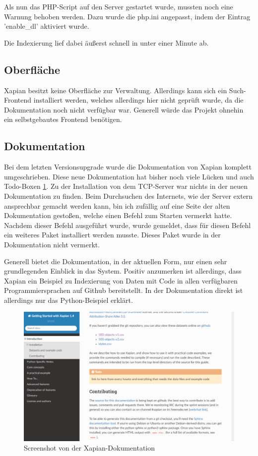 Als nun das PHP-Script auf den Server gestartet wurde, mussten noch eine Warnung behoben werden. Dazu wurde die php.ini angepasst, indem der Eintrag 'enable\_dl' aktiviert wurde. 

Die Indexierung lief dabei äußerst schnell in unter einer Minute ab.

\subsection{Oberfläche}

Xapian besitzt keine Oberfläche zur Verwaltung. Allerdings kann sich ein Such-Frontend installiert werden, welches allerdings hier nicht geprüft wurde, da die Dokumentation noch nicht verfügbar war. Generell würde das Projekt ohnehin ein selbstgebautes Frontend benötigen.

\subsection{Dokumentation}

Bei dem letzten Versionsupgrade wurde die Dokumentation von Xapian komplett umgeschrieben. Diese neue Dokumentation hat bisher noch viele Lücken und auch Todo-Boxen \ref{img:xapianDoku}.
Zu der Installation von dem TCP-Server war nichts in der neuen Dokumentation zu finden. Beim Durchsuchen des Internets, wie der Server extern ansprechbar gemacht werden kann, bin ich zufällig auf eine Seite der alten Dokumentation gestoßen, welche einen Befehl zum Starten vermerkt hatte. Nachdem dieser Befehl ausgeführt wurde, wurde gemeldet, dass für diesen Befehl ein weiteres Paket installiert werden musste. Dieses Paket wurde in der Dokumentation nicht vermerkt. 

Generell bietet die Dokumentation, in der aktuellen Form, nur einen sehr grundlegenden Einblick in das System. Positiv anzumerken ist allerdings, dass Xapian ein Beispiel zu Indexierung von Daten mit Code in allen verfügbaren Programmiersprachen auf Github bereitstellt. In der Dokumentation direkt ist allerdings nur das Python-Beispiel erklärt.

\begin{figure}
	\centering
	\includegraphics[width=1\linewidth]{images/xapian_doku.png}
	\caption{Screenshot von der Xapian-Dokumentation}
	\label{img:xapianDoku}
\end{figure}

